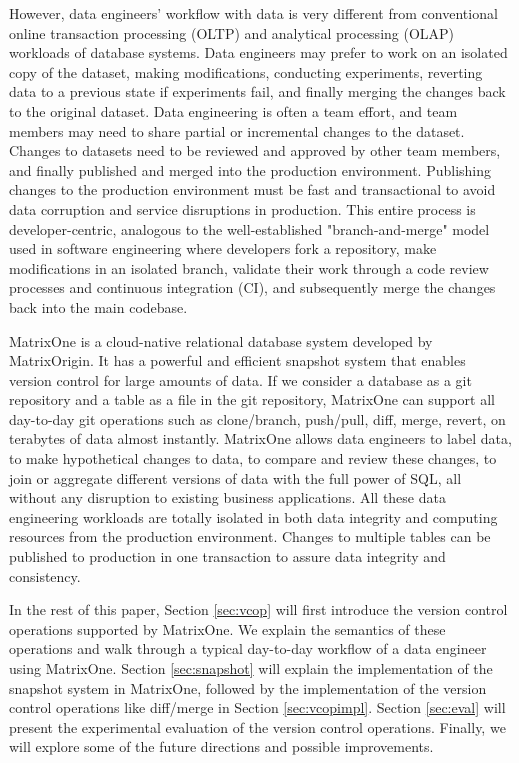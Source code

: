\documentclass[sigconf,nonacm]{acmart} %
\begin{document}
However, data engineers' workflow with data is very different from conventional
online transaction processing (OLTP) and analytical processing (OLAP) 
workloads of database systems.  Data engineers may prefer to work on an
isolated copy of the dataset, making modifications,
conducting experiments, reverting data to a previous state if experiments fail,
and finally merging the changes back to the original dataset.  Data engineering is 
often a team effort, and team members may need to share partial or incremental 
changes to the dataset.  Changes to datasets need to be reviewed and approved by 
other team members, and finally published and merged into the production environment. 
Publishing changes to the production environment must be fast and transactional
to avoid data corruption and service disruptions in production. 
This entire process is developer-centric, analogous to the well-established 
"branch-and-merge" model used in software engineering where developers 
fork a repository, make modifications in an isolated branch, validate their 
work through a code review processes and continuous integration (CI), 
and subsequently merge the changes back into the main codebase.

MatrixOne \cite{MatrixOne} is a cloud-native relational database system developed 
by MatrixOrigin.  It has a powerful and efficient snapshot system that enables 
version control for large amounts of data.  If we consider a database as a git repository and 
a table as a file in the git repository, MatrixOne can support all day-to-day git operations 
such as clone/branch, push/pull, diff, merge, revert, on terabytes of data almost 
instantly.  MatrixOne allows data engineers to label data, 
to make hypothetical changes to data, to compare and review these changes,
to join or aggregate different versions of data with the full power of SQL,
all without any disruption to existing business applications.  
All these data engineering workloads are totally isolated in both data integrity 
and computing resources from the production environment.  Changes to multiple tables 
can be published to production in one transaction to assure data integrity 
and consistency.

In the rest of this paper, Section \ref{sec:vcop} will first introduce the version control operations
supported by MatrixOne.  We explain the semantics of these operations and 
walk through a typical day-to-day workflow of a data engineer using MatrixOne.
Section \ref{sec:snapshot} will explain the implementation of the snapshot system in 
MatrixOne, followed by the implementation of the version control 
operations like diff/merge in Section \ref{sec:vcopimpl}.  Section \ref{sec:eval} 
will present the experimental evaluation of the version control operations.  
Finally, we will explore some of the future directions and possible improvements.
\end{document}
